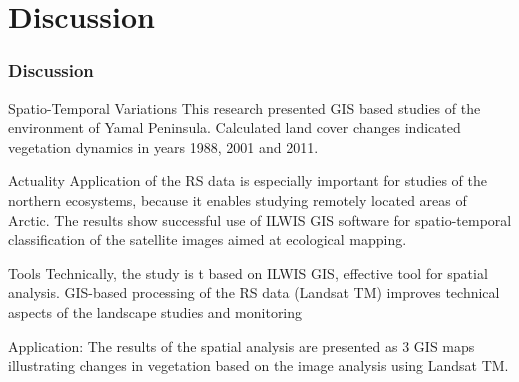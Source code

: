 \documentclass[pdflatex,compress,8pt,
	xcolor={dvipsnames,dvipsnames,svgnames,x11names,table},
	hyperref={colorlinks = true,breaklinks = true, urlcolor = NavyBlue, breaklinks = true}]{beamer}
\begin{document}
\section{Discussion}
\begin{frame}\frametitle{Discussion}
	
\begin{alertblock}{Spatio-Temporal Variations}
This research presented GIS based studies of the environment of Yamal Peninsula. Calculated land cover changes indicated vegetation dynamics in years 1988, 2001 and 2011.
\end{alertblock}

\begin{block}{Actuality}
Application of the RS data is especially important for studies of the northern ecosystems, because it enables studying remotely located areas of Arctic. The results show successful use of ILWIS GIS software for spatio-temporal classification of the satellite images aimed at ecological mapping.
\end{block}

\begin{block}{Tools}
Technically, the study is t based on ILWIS GIS, effective tool for spatial analysis. GIS-based processing of the RS data (Landsat TM) improves technical aspects of the landscape studies and monitoring
\end{block}

\begin{examples}{Application: }
The results of the spatial analysis are presented as 3 GIS maps illustrating changes in vegetation based on the image analysis using Landsat TM.
\end{examples}	

\end{frame}
\end{document}
